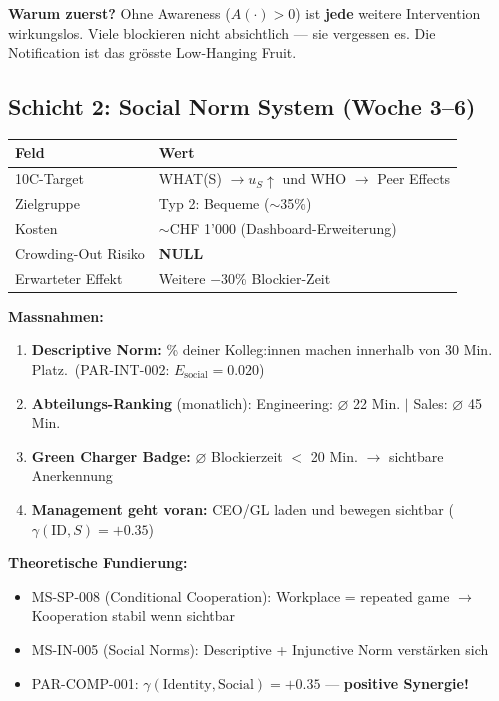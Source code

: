 \documentclass[11pt,a4paper]{article}
\begin{document}
\textbf{Warum zuerst?} Ohne Awareness ($A(\cdot) > 0$) ist \textbf{jede} weitere Intervention wirkungslos. Viele blockieren nicht absichtlich --- sie vergessen es. Die Notification ist das gr\"osste Low-Hanging Fruit.

\subsection{Schicht 2: Social Norm System (Woche 3--6)}

\begin{table}[H]
\centering
\begin{tabular}{ll}
\toprule
\textbf{\color{fadarkblue}Feld} & \textbf{\color{fadarkblue}Wert} \\
\midrule
10C-Target & WHAT(S) $\rightarrow u_S\uparrow$ und WHO $\rightarrow$ Peer Effects \\
Zielgruppe & Typ 2: Bequeme ($\sim$35\%) \\
Kosten & $\sim$CHF 1'000 (Dashboard-Erweiterung) \\
Crowding-Out Risiko & \textcolor{famint}{\textbf{NULL}} \\
Erwarteter Effekt & Weitere $-$30\% Blockier-Zeit \\
\bottomrule
\end{tabular}
\end{table}

\textbf{Massnahmen:}
\begin{enumerate}[noitemsep]
\item \textbf{Descriptive Norm:} \% deiner Kolleg:innen machen innerhalb von 30 Min. Platz.\guillemotright\ (PAR-INT-002: $E_{\text{social}} = 0.020$)
\item \textbf{Abteilungs-Ranking} (monatlich): \guillemotleft Engineering: $\varnothing$ 22 Min. $|$ Sales: $\varnothing$ 45 Min.\guillemotright
\item \textbf{Green Charger Badge:} $\varnothing$ Blockierzeit $<$ 20 Min. $\rightarrow$ sichtbare Anerkennung
\item \textbf{Management geht voran:} CEO/GL laden und bewegen sichtbar ($\gamma(\text{ID},S) = +0.35$)
\end{enumerate}

\textbf{Theoretische Fundierung:}
\begin{itemize}[noitemsep]
\item MS-SP-008 (Conditional Cooperation): Workplace = repeated game $\rightarrow$ Kooperation stabil wenn sichtbar
\item MS-IN-005 (Social Norms): Descriptive + Injunctive Norm verst\"arken sich
\item PAR-COMP-001: $\gamma(\text{Identity}, \text{Social}) = +0.35$ --- \textbf{positive Synergie!}
\end{itemize}
\end{document}
